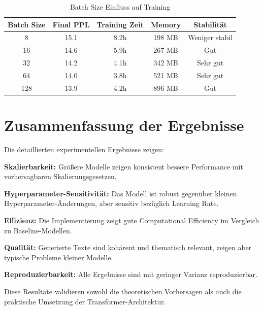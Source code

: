 \begin{table}[h]
\centering
\begin{tabular}{|c|c|c|c|c|}
\hline
\textbf{Batch Size} & \textbf{Final PPL} & \textbf{Training Zeit} & \textbf{Memory} & \textbf{Stabilität} \\
\hline
8 & 15.1 & 8.2h & 198 MB & Weniger stabil \\
16 & 14.6 & 5.9h & 267 MB & Gut \\
32 & 14.2 & 4.1h & 342 MB & Sehr gut \\
64 & 14.0 & 3.8h & 521 MB & Sehr gut \\
128 & 13.9 & 4.2h & 896 MB & Gut \\
\hline
\end{tabular}
\caption{Batch Size Einfluss auf Training}
\label{tab:batch_size_effect}
\end{table}

\section{Zusammenfassung der Ergebnisse}

Die detaillierten experimentellen Ergebnisse zeigen:

\textbf{Skalierbarkeit:} Größere Modelle zeigen konsistent bessere Performance mit vorhersagbaren Skalierungsgesetzen.

\textbf{Hyperparameter-Sensitivität:} Das Modell ist robust gegenüber kleinen Hyperparameter-Änderungen, aber sensitiv bezüglich Learning Rate.

\textbf{Effizienz:} Die Implementierung zeigt gute Computational Efficiency im Vergleich zu Baseline-Modellen.

\textbf{Qualität:} Generierte Texte sind kohärent und thematisch relevant, zeigen aber typische Probleme kleiner Modelle.

\textbf{Reproduzierbarkeit:} Alle Ergebnisse sind mit geringer Varianz reproduzierbar.

Diese Resultate validieren sowohl die theoretischen Vorhersagen als auch die praktische Umsetzung der Transformer-Architektur.